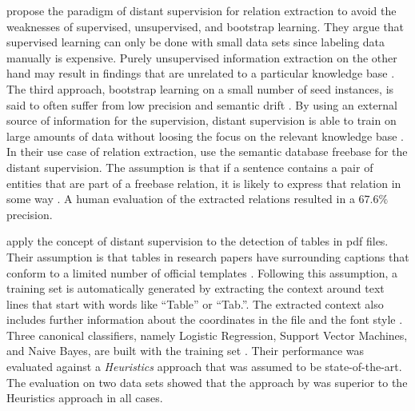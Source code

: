 \bigskip

\citet{mintz2009distant} propose the paradigm of \gls{distant supervision} for relation extraction to avoid the weaknesses of supervised, unsupervised, and bootstrap learning.
They argue that supervised learning can only be done with small data sets since labeling data manually is expensive.
Purely unsupervised information extraction on the other hand may result in findings that are unrelated to a particular knowledge base \citep{mintz2009distant}.
The third approach, bootstrap learning on a small number of seed instances, is said to often suffer from low precision and semantic drift \citep{mintz2009distant}.
By using an external source of information for the supervision, \gls{distant supervision} is able to train on large amounts of data without loosing the focus on the relevant knowledge base \citep{mintz2009distant}.
In their use case of relation extraction, \citet{mintz2009distant} use the semantic database \gls{freebase} \citep{bollacker2008freebase} for the \gls{distant supervision}.
The assumption is that if a sentence contains a pair of entities that are part of a \gls{freebase} relation, it is likely to express that relation in some way \citep{mintz2009distant}.
A human evaluation of the extracted relations resulted in a $67.6\%$ precision.

\citet{fan2015detecting} apply the concept of \gls{distant supervision} to the detection of tables in \gls{pdf} files.
Their assumption is that tables in research papers have surrounding captions that conform to a limited number of official templates \citep{fan2015detecting}.
Following this assumption, a training set is automatically generated by extracting the context around text lines that start with words like ``Table'' or ``Tab.''.
The extracted context also includes further information about the coordinates in the file and the font style \citep{fan2015detecting}.
Three canonical classifiers, namely Logistic Regression, Support Vector Machines, and Naive Bayes, are built with the training set \citep{fan2015detecting}.
Their performance was evaluated against a \emph{Heuristics} approach \citep{klampfl2014comparison} that was assumed to be state-of-the-art.
The evaluation on two data sets showed that the approach by \citet{fan2015detecting} was superior to the Heuristics approach in all cases.


\bigskip

